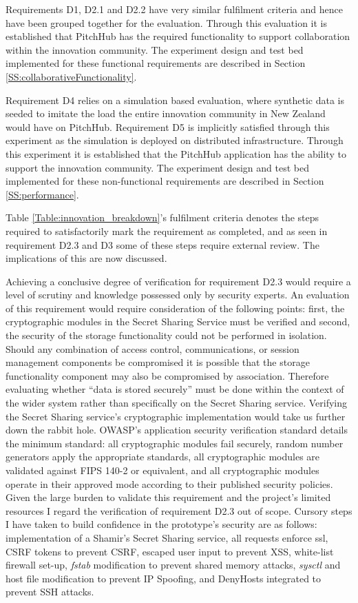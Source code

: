 Requirements D1, D2.1 and D2.2 have very similar fulfilment criteria and hence have been grouped together for the evaluation. Through this evaluation it is established that PitchHub has the required functionality to support collaboration within the innovation community. The experiment design and test bed implemented for these functional requirements are described in Section \ref{SS:collaborativeFunctionality}.

Requirement D4 relies on a simulation based evaluation, where synthetic data is seeded to imitate the load the entire innovation community in New Zealand would have on PitchHub. Requirement D5 is implicitly satisfied through this experiment as the simulation is deployed on distributed infrastructure. Through this experiment it is established that the PitchHub application has the ability to support the innovation community. The experiment design and test bed implemented for these non-functional requirements are described in Section \ref{SS:performance}.

Table \ref{Table:innovation_breakdown}'s fulfilment criteria denotes the steps required to satisfactorily mark the requirement as completed, and as seen in requirement D2.3 and D3 some of these steps require external review. The implications of this are now discussed.

Achieving a conclusive degree of verification for requirement D2.3 would require a level of scrutiny and knowledge possessed only by security experts. An evaluation of this requirement would require consideration of the following points: first, the cryptographic modules in the Secret Sharing Service must be verified and second, the security of the storage functionality could not be performed in isolation. Should any combination of access control, communications, or session management components be compromised it is possible that the storage functionality component may also be compromised by association. Therefore evaluating whether ``data is stored securely'' must be done within the context of the wider system rather than specifically on the Secret Sharing service. Verifying the Secret Sharing service's cryptographic implementation would take us further down the rabbit hole. OWASP's application security verification standard \cite{OWASP:online} details the minimum standard: all cryptographic modules fail securely, random number generators apply the appropriate standards, all cryptographic modules are validated against FIPS 140-2 or equivalent, and all cryptographic modules operate in their approved mode according to their published security policies. Given the large burden to validate this requirement and the project's limited resources I regard the verification of requirement D2.3 out of scope. Cursory steps I have taken to build confidence in the prototype's security are as follows: implementation of a Shamir's Secret Sharing service, all requests enforce ssl, CSRF tokens to prevent CSRF, escaped user input to prevent XSS, 
white-list firewall set-up, \textit{fstab} modification to prevent shared memory attacks, \textit{sysctl} and host file modification to prevent IP Spoofing, and DenyHosts \cite{DenyH6:online} integrated to prevent SSH attacks.


